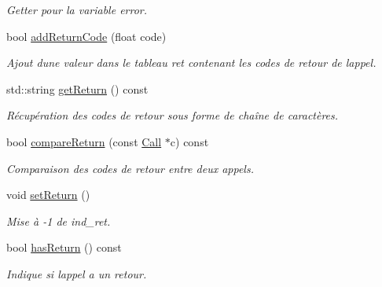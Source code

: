 \begin{DoxyCompactItemize}
\begin{DoxyCompactList}\small\item\em Getter pour la variable {\ttfamily error}. \end{DoxyCompactList}\item 
bool \hyperlink{class_call_a60fcad7a31734fe08b1d30003099597d}{add\+Return\+Code} (float code)
\begin{DoxyCompactList}\small\item\em Ajout d\textquotesingle{}une valeur dans le tableau {\ttfamily ret} contenant les codes de retour de l\textquotesingle{}appel. \end{DoxyCompactList}\item 
std\+::string \hyperlink{class_call_a16aa36fdd27ccbbe7102e92b10eeb455}{get\+Return} () const 
\begin{DoxyCompactList}\small\item\em Récupération des codes de retour sous forme de chaîne de caractères. \end{DoxyCompactList}\item 
bool \hyperlink{class_call_a55acd6e34cc1510d6fabc354a1883c8e}{compare\+Return} (const \hyperlink{class_call}{Call} $\ast$c) const 
\begin{DoxyCompactList}\small\item\em Comparaison des codes de retour entre deux appels. \end{DoxyCompactList}\item 
void \hyperlink{class_call_aacee3123aaa6a75fb52b360cf9635dc3}{set\+Return} ()
\begin{DoxyCompactList}\small\item\em Mise à -\/1 de {\ttfamily ind\+\_\+ret}. \end{DoxyCompactList}\item 
bool \hyperlink{class_call_a4d93216142746c833503dec59c07c11c}{has\+Return} () const 
\begin{DoxyCompactList}\small\item\em Indique si l\textquotesingle{}appel a un retour. \end{DoxyCompactList}\end{DoxyCompactItemize}
